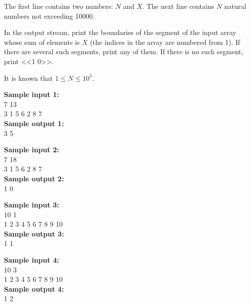 \documentclass[a4paper]{article}
\begin{document}
The first line contains two numbers: $N$ and $X$. The next line contains $N$ natural numbers not exceeding 10000.

In the output stream, print the boundaries of the segment of the input array whose sum of elements is $X$ (the indices in the array are numbered from 1). If there are several such segments, print any of them. If there is no such segment, print <<1 0>>.

It is known that $1 \le N \le 10^5$.

\LINE

\noindent \textbf{Sample input 1:}\\
7 13\\
3 1 5 6 2 8 7\\


\noindent \textbf{Sample output 1:}\\
3 5


\SPACE

\noindent \textbf{Sample input 2:}\\
7 18\\
3 1 5 6 2 8 7\\


\noindent \textbf{Sample output 2:}\\
1 0


\SPACE

\noindent \textbf{Sample input 3:}\\
10 1\\
1 2 3 4 5 6 7 8 9 10\\


\noindent \textbf{Sample output 3:}\\
1 1

\SPACE


\noindent \textbf{Sample input 4:}\\
10 3\\
1 2 3 4 5 6 7 8 9 10\\


\noindent \textbf{Sample output 4:}\\
1 2
\end{document}
